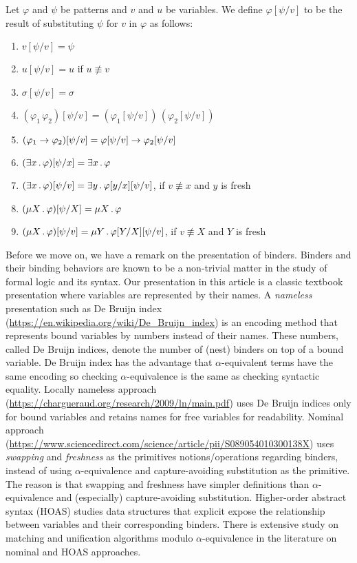 \documentclass{article}
\begin{document}
\begin{definition}
\label{def:substitutions}
Let $\varphi$ and $\psi$ be patterns and $v$ and $u$ be variables.
We define $\varphi[\psi/v]$ to be the result of substituting
$\psi$ for $v$ in $\varphi$ as follows:
\begin{enumerate}
\item $v[\psi/v] = \psi$
\item $u[\psi/v] = u$ if $u \not\equiv v$
\item $\sigma[\psi/v] = \sigma$
\item $(\varphi_1 \, \varphi_2)[\psi/v] 
       = (\varphi_1[\psi/v]) \, (\varphi_2[\psi/v])$
\item $(\varphi_1 \to \varphi_2)[\psi/v]
       =\varphi[\psi/v] \to \varphi_2[\psi/v]$
\item $(\exists x \,.\, \varphi)[\psi/x] = \exists x \,.\, \varphi$
\item $(\exists x \,.\, \varphi)[\psi/v] = \exists y \,.\, \varphi[y/x][\psi/v]$,
      if $v \not\equiv x$ and $y$ is fresh
\item $(\mu X \,.\, \varphi)[\psi/X] = \mu X \,.\, \varphi$
\item $(\mu X \,.\, \varphi)[\psi/v] = \mu Y \,.\, \varphi[Y/X][\psi/v]$,
      if $v \not\equiv X$ and $Y$ is fresh
\end{enumerate}
\end{definition}

Before we move on, we have a remark on the presentation of binders. 
Binders and their binding behaviors are known to be a non-trivial matter
in the study of formal logic and its syntax. 
Our presentation in this article 
is a classic textbook presentation 
where variables are represented by their names. 
A \emph{nameless} presentation such as De Bruijn index 
(\url{https://en.wikipedia.org/wiki/De_Bruijn_index})
is an encoding method that represents bound variables by numbers instead of their names. 
These numbers, called De Bruijn indices, denote the number of (nest) binders
on top of a bound variable. 
De Bruijn index has the advantage that $\alpha$-equivalent terms
have the same encoding
so checking $\alpha$-equivalence is the same as checking syntactic equality. 
Locally nameless approach
(\url{https://chargueraud.org/research/2009/ln/main.pdf})
uses De Bruijn indices only for bound variables
and retains names for free variables for readability. 
Nominal approach (\url{https://www.sciencedirect.com/science/article/pii/S089054010300138X})
uses \emph{swapping} and \emph{freshness} as the primitives notions/operations
regarding binders, instead of using 
$\alpha$-equivalence and capture-avoiding substitution as the primitive. 
The reason is that swapping and freshness have simpler definitions
than $\alpha$-equivalence and (especially) capture-avoiding substitution.
Higher-order abstract syntax (HOAS) studies data structures
that explicit expose the relationship between variables and their corresponding binders. 
There is extensive study on matching and unification algorithms
modulo $\alpha$-equivalence in the literature on
nominal and HOAS approaches. 
\end{document}
